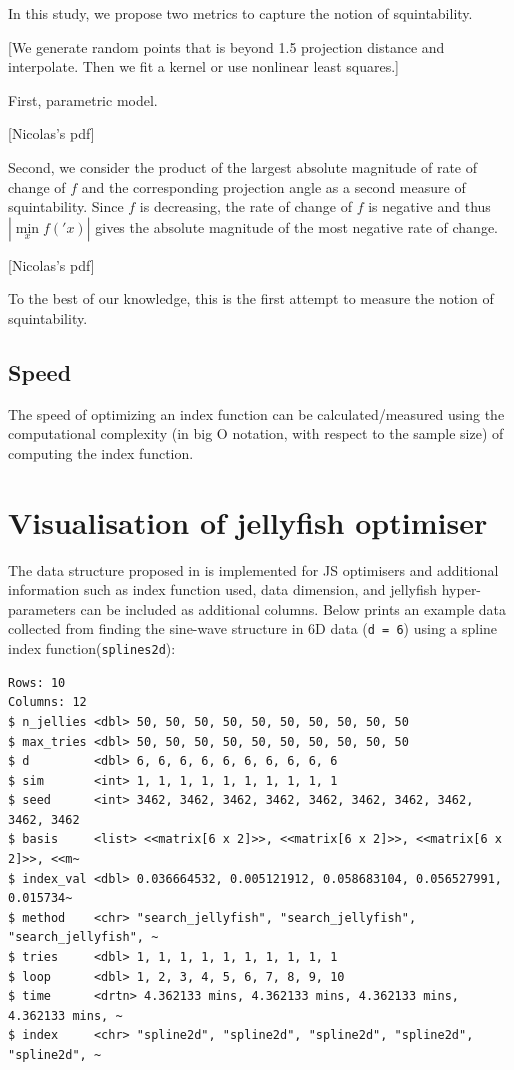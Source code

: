 \documentclass[
  number,
  preprint,
  3p]{elsarticle}
\begin{document}
In this study, we propose two metrics to capture the notion of
squintability.

{[}We generate random points that is beyond 1.5 projection distance and
interpolate. Then we fit a kernel or use nonlinear least squares.{]}

First, parametric model.

{[}Nicolas's pdf{]}

Second, we consider the product of the largest absolute magnitude of
rate of change of \(f\) and the corresponding projection angle as a
second measure of squintability. Since \(f\) is decreasing, the rate of
change of \(f\) is negative and thus \(|\underset{x}{\min} f('x)|\)
gives the absolute magnitude of the most negative rate of change.

{[}Nicolas's pdf{]}

To the best of our knowledge, this is the first attempt to measure the
notion of squintability.

\subsection{Speed}\label{speed}

The speed of optimizing an index function can be calculated/measured
using the computational complexity (in big O notation, with respect to
the sample size) of computing the index function.

\section{Visualisation of jellyfish optimiser}\label{sec-vis}

The data structure proposed in \citet{RJ-2021-105} is implemented for JS
optimisers and additional information such as index function used, data
dimension, and jellyfish hyper-parameters can be included as additional
columns. Below prints an example data collected from finding the
sine-wave structure in 6D data (\texttt{d\ =\ 6}) using a spline index
function(\texttt{splines2d}):

\begin{verbatim}
Rows: 10
Columns: 12
$ n_jellies <dbl> 50, 50, 50, 50, 50, 50, 50, 50, 50, 50
$ max_tries <dbl> 50, 50, 50, 50, 50, 50, 50, 50, 50, 50
$ d         <dbl> 6, 6, 6, 6, 6, 6, 6, 6, 6, 6
$ sim       <int> 1, 1, 1, 1, 1, 1, 1, 1, 1, 1
$ seed      <int> 3462, 3462, 3462, 3462, 3462, 3462, 3462, 3462, 3462, 3462
$ basis     <list> <<matrix[6 x 2]>>, <<matrix[6 x 2]>>, <<matrix[6 x 2]>>, <<m~
$ index_val <dbl> 0.036664532, 0.005121912, 0.058683104, 0.056527991, 0.015734~
$ method    <chr> "search_jellyfish", "search_jellyfish", "search_jellyfish", ~
$ tries     <dbl> 1, 1, 1, 1, 1, 1, 1, 1, 1, 1
$ loop      <dbl> 1, 2, 3, 4, 5, 6, 7, 8, 9, 10
$ time      <drtn> 4.362133 mins, 4.362133 mins, 4.362133 mins, 4.362133 mins, ~
$ index     <chr> "spline2d", "spline2d", "spline2d", "spline2d", "spline2d", ~
\end{verbatim}
\end{document}
